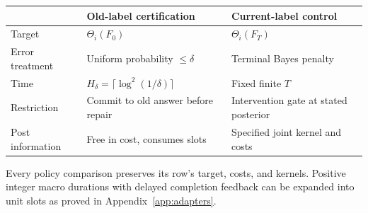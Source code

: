 \begin{center}\small
\begin{tabular}{p{.25\linewidth}p{.32\linewidth}p{.32\linewidth}}
\toprule
 & Old-label certification & Current-label control\\\midrule
Target & $\Theta_i(F_0)$ & $\Theta_i(F_T)$\\
Error treatment & Uniform probability $\le\delta$ & Terminal Bayes penalty\\
Time & $H_\delta=\lceil\log^2(1/\delta)\rceil$ & Fixed finite $T$\\
Restriction & Commit to old answer before repair & Intervention gate at stated posterior\\
Post information & Free in cost, consumes slots & Specified joint kernel and costs\\
\bottomrule
\end{tabular}
\end{center}
Every policy comparison preserves its row's target, costs, and kernels.
Positive integer macro durations with delayed completion feedback can be
expanded into unit slots as proved in Appendix~\ref{app:adapters}.
